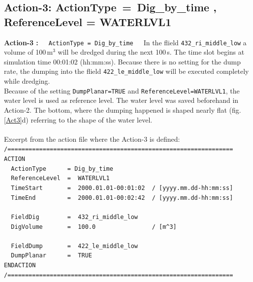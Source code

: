 \subsection{Action-3: ActionType\, = \,Dig\_by\_time , ReferenceLevel = WATERLVL1}
\label{ssec:E4Action3}
\textbf{Action-3 :}~~~\texttt{ActionType\,=\,Dig\_by\_time}~~~In the flield \texttt{432\_ri\_middle\_low} a
volume of 100\,m$^3$ will be dredged during the next 100\,s.
The time slot begins at simulation time 00:01:02 (hh:mm:ss). Because there is no setting for
the dump rate, the dumping into the flield \texttt{422\_le\_middle\_low} will be executed completely while dredging.
\\Because of the setting \texttt{DumpPlanar=TRUE} and \texttt{ReferenceLevel=WATERLVL1}, the
water level is used as reference level. The water level was saved beforehand in Action-2.
The bottom, where the dumping happened is shaped nearly flat (fig.\,\ref{Act3}d) referring to the shape of
the water level. \\
\\
Excerpt from the action file where the Action-3 is defined:
\\ \hspace*{3mm} \texttt{\small{/================================================================}}
\\ \hspace*{3mm} \texttt{\small{ACTION}}
\\ \hspace*{3mm} \texttt{\small{~~ActionType~~~~~~=~Dig\_by\_time}}
\\ \hspace*{3mm} \texttt{\small{~~ReferenceLevel~~=~~WATERLVL1}}
\\ \hspace*{3mm} \texttt{\small{~~TimeStart~~~~~~~=~~2000.01.01-00:01:02~~/~[yyyy.mm.dd-hh:mm:ss]}}
\\ \hspace*{3mm} \texttt{\small{~~TimeEnd~~~~~~~~~=~~2000.01.01-00:02:42~~/~[yyyy.mm.dd-hh:mm:ss]}}
\\ \hspace*{3mm}
\\ \hspace*{3mm} \texttt{\small{~~FieldDig~~~~~~~~=~~432\_ri\_middle\_low}}
\\ \hspace*{3mm} \texttt{\small{~~DigVolume~~~~~~~=~~100.0~~~~~~~~~~~~~~~~/~[m\textasciicircum3]}}
\\ \hspace*{3mm}
\\ \hspace*{3mm} \texttt{\small{~~FieldDump~~~~~~~=~~422\_le\_middle\_low}}
\\ \hspace*{3mm} \texttt{\small{~~DumpPlanar~~~~~~=~~TRUE}}
\\ \hspace*{3mm} \texttt{\small{ENDACTION}}
\\ \hspace*{3mm} \texttt{\small{/================================================================}}


